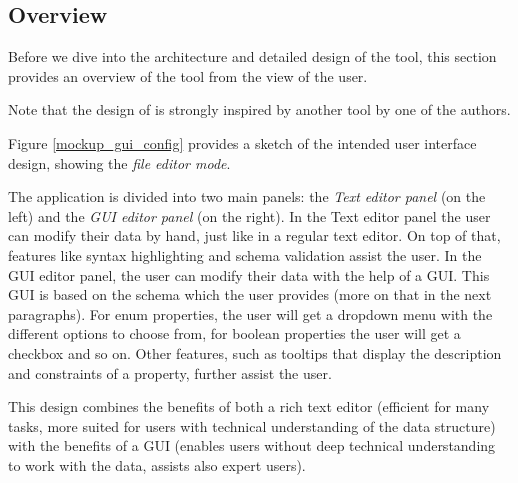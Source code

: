 
\subsection{Overview}\label{subsec:overview} %
Before we dive into the architecture and detailed design of the tool, this section provides an overview of the tool from the view of the user.

Note that the design of \toolname{} is strongly inspired by another tool by one of the authors\cite{githubBspEditor}.

Figure \ref{mockup_gui_config} provides a sketch of the intended user interface design, showing the \textit{file editor mode}.

The application is divided into two main panels: the  \textit{Text editor panel} (on the left) and the \textit{GUI editor panel} (on the right).
In the Text editor panel the user can modify their data by hand, just like in a regular text editor.
On top of that, features like syntax highlighting and schema validation assist the user.
In the GUI editor panel, the user can modify their data with the help of a GUI.
This GUI is based on the schema which the user provides (more on that in the next paragraphs).
For enum properties, the user will get a dropdown menu with the different options to choose from, for boolean properties the user will get a checkbox and so on.
Other features, such as tooltips that display the description and constraints of a property, further assist the user.

This design combines the benefits of both a rich text editor (efficient for many tasks, more suited for users with technical understanding of the data structure) with the benefits of a GUI (enables users without deep technical understanding to work with the data, assists also expert users).


